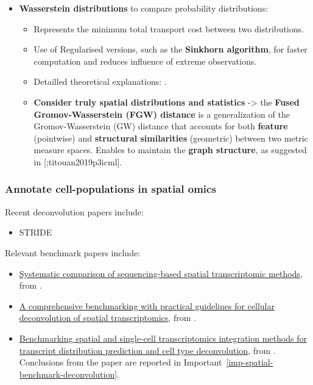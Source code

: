 \documentclass[
  letterpaper,
]{book}
\providecommand{\tightlist}{%
  \setlength{\itemsep}{0pt}\setlength{\parskip}{0pt}}\usepackage{longtable,booktabs,array}
\begin{document}
\begin{itemize}
\tightlist
\item
  \textbf{Wasserstein distributions} to compare probability
  distributions:

  \begin{itemize}
  \tightlist
  \item
    Represents the minimum total transport cost between two
    distributions.
  \item
    Use of Regularised versions, such as the \textbf{Sinkhorn
    algorithm}, for faster computation and reduces influence of extreme
    observations.
  \item
    Detailled theoretical explanations:
    \autocite{rolet2016p1icais,huizing2022,solomon2017smmo,peyre}.
  \item
    \textbf{Consider truly spatial distributions and statistics}
    -\textgreater{} the \textbf{Fused Gromov-Wasserstein (FGW) distance}
    is a generalization of the Gromov-Wasserstein (GW) distance that
    accounts for both \textbf{feature} (pointwise) and
    \textbf{structural similarities} (geometric) between two metric
    measure spaces. Enables to maintain the \textbf{graph structure}, as
    suggested in {[}\textcite{vayer2020a};titouan2019p3icml{]}.
  \end{itemize}
\end{itemize}

\subsubsection{Annotate cell-populations in spatial
omics}\label{annotate-cell-populations-in-spatial-omics}

Recent deconvolution papers include:

\begin{itemize}
\tightlist
\item
  STRIDE
\end{itemize}

Relevant benchmark papers include:

\begin{itemize}
\tightlist
\item
  \href{https://www.nature.com/articles/s41592-024-02325-3}{Systematic
  comparison of sequencing-based spatial transcriptomic methods}, from
  \textcite{you2024nm}.
\item
  \href{https://www.nature.com/articles/s41467-023-37168-7}{A
  comprehensive benchmarking with practical guidelines for cellular
  deconvolution of spatial transcriptomics}, from \textcite{li2023nc}.
\item
  \href{https://www.nature.com/articles/s41592-022-01480-9}{Benchmarking
  spatial and single-cell transcriptomics integration methods for
  transcript distribution prediction and cell type deconvolution}, from
  \textcite{li2022nm}. Conclusions from the paper are reported in
  Important~\ref{imp-spatial-benchmark-deconvolution}.
\end{itemize}
\end{document}
